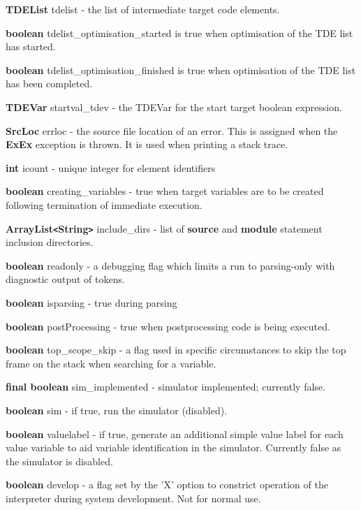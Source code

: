 \documentclass[10pt,a4paper,twoside,fleqn]{book}
\begin{document}
            {\bf TDEList} tdelist - the list of
            intermediate target code elements.
            
            {\bf boolean} tdelist\_optimisation\_started is true when optimisation
            of the TDE list has started.
            
            {\bf boolean} tdelist\_optimisation\_finished is true when optimisation
            of the TDE list has been completed.

            {\bf TDEVar} startval\_tdev - the TDEVar for
            the start target boolean expression.

            {\bf SrcLoc} errloc - the source file location of an error.
            This is assigned when the {\bf ExEx} exception is thrown. It is used
            when printing a stack trace.

            {\bf int} icount - unique integer for element identifiers

            {\bf boolean} creating\_variables - true when target
            variables are to be created following termination of immediate execution.

            {\bf ArrayList\verb'<'String\verb'>'} include\_dirs - list of {\bf source} and {\bf module}
            statement inclusion directories.

            {\bf boolean} readonly - a debugging flag which limits a run to parsing-only with
            diagnostic output of tokens.

            {\bf boolean} isparsing - true during parsing

            {\bf boolean} postProcessing - true when postprocessing code is being executed.

            {\bf boolean} top\_scope\_skip - a flag used in specific circumstances
            to skip the top frame on the stack when searching for a variable.

            {\bf final boolean} sim\_implemented - simulator implemented;
            currently false.

            {\bf boolean} sim - if true, run the simulator (disabled).
            
            {\bf boolean} valuelabel - if true, generate an additional simple
            value label for each value variable to aid variable identification in
            the simulator. Currently false as the simulator is disabled.

            {\bf boolean} develop - a flag set by the 'X' option to constrict operation
            of the interpreter during system development. Not for normal use.
\end{document}
